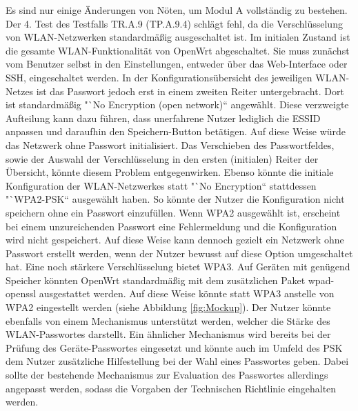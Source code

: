 \documentclass[a4paper]{book}
\begin{document}
\begin{large}
\begin{onehalfspace}
 	Es sind nur einige Änderungen von Nöten, um Modul A vollständig zu bestehen. Der 4. Test des Testfalls TR.A.9 (TP.A.9.4) schlägt fehl, da die Verschlüsselung von WLAN-Netzwerken standardmäßig ausgeschaltet ist. Im initialen Zustand ist die gesamte WLAN-Funktionalität von OpenWrt abgeschaltet. Sie muss zunächst vom Benutzer selbst in den Einstellungen, entweder über das Web-Interface oder SSH, eingeschaltet werden. In der Konfigurationsübersicht des jeweiligen WLAN-Netzes ist das Passwort jedoch erst in einem zweiten Reiter untergebracht. Dort ist standardmäßig "`No Encryption (open network)“ angewählt. Diese verzweigte Aufteilung kann dazu führen, dass unerfahrene Nutzer lediglich die ESSID anpassen und daraufhin den Speichern-Button betätigen. Auf diese Weise würde das Netzwerk ohne Passwort initialisiert. Das Verschieben des Passwortfeldes, sowie der Auswahl der Verschlüsselung in den ersten (initialen) Reiter der Übersicht, könnte diesem Problem entgegenwirken. Ebenso könnte die initiale Konfiguration der WLAN-Netzwerkes statt "`No Encryption“ stattdessen "`WPA2-PSK“ ausgewählt haben. So könnte der Nutzer die Konfiguration nicht speichern ohne ein Passwort einzufüllen. Wenn WPA2 ausgewählt ist, erscheint bei einem unzureichenden Passwort eine Fehlermeldung und die Konfiguration wird nicht gespeichert. Auf diese Weise kann dennoch gezielt ein Netzwerk ohne Passwort erstellt werden, wenn der Nutzer bewusst auf diese Option umgeschaltet hat. Eine noch stärkere Verschlüsselung bietet WPA3. Auf Geräten mit genügend Speicher könnten OpenWrt standardmäßig mit dem zusätzlichen Paket \glqq wpad-openssl\grqq{} ausgestattet werden. Auf diese Weise könnte statt WPA3 anstelle von WPA2 eingestellt werden (siehe Abbildung \ref{fig:Mockup}). Der Nutzer könnte ebenfalls von einem Mechanismus unterstützt werden, welcher die Stärke des WLAN-Passwortes darstellt. Ein ähnlicher Mechanismus wird bereits bei der Prüfung des Geräte-Passwortes eingesetzt und könnte auch im Umfeld des PSK dem Nutzer zusätzliche Hilfestellung bei der Wahl eines Passwortes geben. Dabei sollte der bestehende Mechanismus zur Evaluation des Passwortes allerdings angepasst werden, sodass die Vorgaben der Technischen Richtlinie eingehalten werden. \vfill \pagebreak


\end{onehalfspace}
\end{large}
\end{document}
